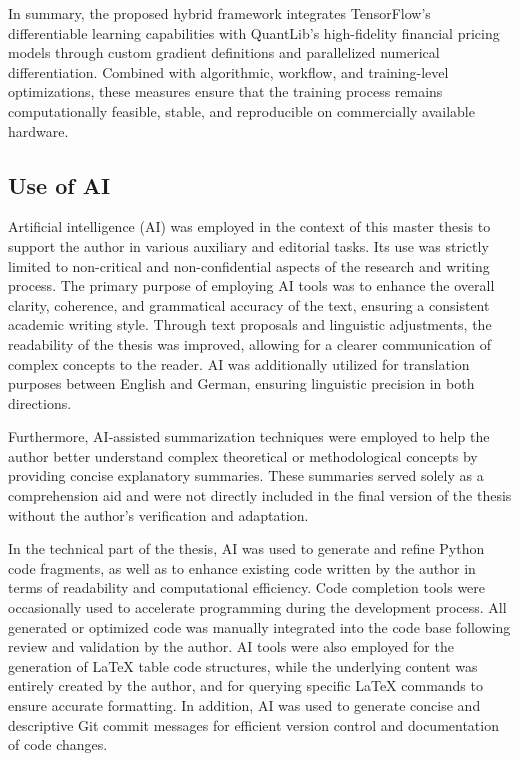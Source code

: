 {In summary, the proposed hybrid framework integrates TensorFlow’s differentiable learning capabilities with QuantLib’s high-fidelity financial pricing models through custom gradient definitions and parallelized numerical differentiation. Combined with algorithmic, workflow, and training-level optimizations, these measures ensure that the training process remains computationally feasible, stable, and reproducible on commercially available hardware.

\subsection{Use of AI}
Artificial intelligence (AI) was employed in the context of this master thesis to support the author in various auxiliary and editorial tasks. Its use was strictly limited to non-critical and non-confidential aspects of the research and writing process. The primary purpose of employing AI tools was to enhance the overall clarity, coherence, and grammatical accuracy of the text, ensuring a consistent academic writing style. Through text proposals and linguistic adjustments, the readability of the thesis was improved, allowing for a clearer communication of complex concepts to the reader. AI was additionally utilized for translation purposes between English and German, ensuring linguistic precision in both directions. 

Furthermore, AI-assisted summarization techniques were employed to help the author better understand complex theoretical or methodological concepts by providing concise explanatory summaries. These summaries served solely as a comprehension aid and were not directly included in the final version of the thesis without the author’s verification and adaptation.

In the technical part of the thesis, AI was used to generate and refine Python code fragments, as well as to enhance existing code written by the author in terms of readability and computational efficiency. Code completion tools were occasionally used to accelerate programming during the development process. All generated or optimized code was manually integrated into the code base following review and validation by the author. AI tools were also employed for the generation of LaTeX table code structures, while the underlying content was entirely created by the author, and for querying specific LaTeX commands to ensure accurate formatting. In addition, AI was used to generate concise and descriptive Git commit messages for efficient version control and documentation of code changes.

}

